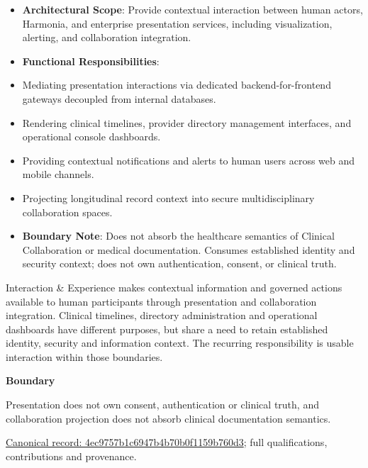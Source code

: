 \begin{itemize}


\item \textbf{Architectural Scope}: Provide contextual interaction between human actors, Harmonia, and enterprise presentation services, including visualization, alerting, and collaboration integration.

\item \textbf{Functional Responsibilities}:

\item Mediating presentation interactions via dedicated backend-for-frontend gateways decoupled from internal databases.

\item Rendering clinical timelines, provider directory management interfaces, and operational console dashboards.

\item Providing contextual notifications and alerts to human users across web and mobile channels.

\item Projecting longitudinal record context into secure multidisciplinary collaboration spaces.

\item \textbf{Boundary Note}: Does not absorb the healthcare semantics of Clinical Collaboration or medical documentation. Consumes established identity and security context; does not own authentication, consent, or clinical truth.

\end{itemize}


Interaction \& Experience makes contextual information and governed actions available to human participants through presentation and collaboration integration. Clinical timelines, directory administration and operational dashboards have different purposes, but share a need to retain established identity, security and information context. The recurring responsibility is usable interaction within those boundaries.



\textbf{Boundary}



Presentation does not own consent, authentication or clinical truth, and collaboration projection does not absorb clinical documentation semantics.


{\footnotesize \href{../../../../continuum/strategy/capability/4ec9757b1c6947b4b70b0f1159b760d3.md}{Canonical record: 4ec9757b1c6947b4b70b0f1159b760d3}; full qualifications, contributions and provenance.}\par
